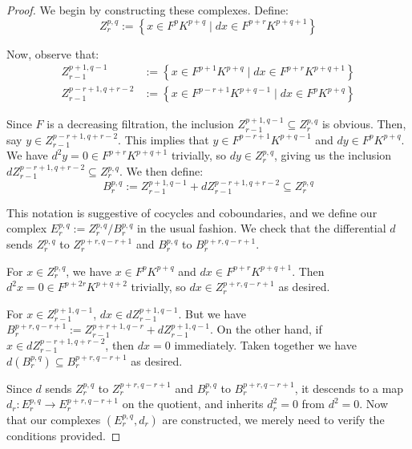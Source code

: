 \documentclass[11pt]{article}
\theoremstyle{definition}
\numberwithin{theorem}{section} %
\numberwithin{equation}{section} %
\begin{document}
\begin{proof}
    We begin by constructing these complexes. Define:
    $$
    Z^{p,q}_r:=\left\{x\in F^p K^{p+q}\mid dx\in F^{p+r}K^{p+q+1}\right\}
    $$
    
    Now, observe that:
    \begin{align*}
    Z^{p+1,q-1}_{r-1}&:= \left\{x\in F^{p+1} K^{p+q}\mid dx\in F^{p+r}K^{p+q+1}\right\} \\
    Z_{r-1}^{p-r+1,q+r-2} &:= \left\{x\in F^{p-r+1} K^{p+q-1}\mid dx\in F^{p}K^{p+q}\right\} 
    \end{align*}
    
    \noindent Since $F$ is a decreasing filtration, the inclusion $Z_{r-1}^{p+1,q-1} \subseteq Z_r^{p,q}$ is obvious. Then, say $y\in Z_{r-1}^{p-r+1,q+r-2}$. This implies that $y\in F^{p-r+1} K^{p+q-1}$ and $dy\in F^{p} K^{p+q}$. We have $d^2y =0\in F^{p+r}K^{p+q+1}$ trivially, so $dy \in Z_r^{p,q}$, giving us the inclusion $dZ_{r-1}^{p-r+1,q+r-2}\subseteq Z_r^{p,q}$. We then define:
    $$
    B_r^{p,q} := Z_{r-1}^{p+1,q-1} + dZ_{r-1}^{p-r+1,q+r-2} \subseteq Z_r^{p,q}
    $$
    
    \noindent This notation is suggestive of cocycles and coboundaries, and we define our complex $E_r^{p,q}:= Z_r^{p,q}/B_r^{p,q}$ in the usual fashion. We check that the differential $d$ sends $Z_r^{p,q}$ to $Z_r^{p+r,q-r+1}$ and $B_r^{p,q}$ to $B_r^{p+r,q-r+1}$. 

    \medskip
    
    \noindent For $x\in Z^{p,q}_r$, we have $x\in F^p K^{p+q}$ and $dx \in F^{p+r}K^{p+q+1}$. Then $d^2x = 0\in F^{p+2r}K^{p+q+2}$ trivially, so $dx\in Z_r^{p+r, q-r+1}$ as desired. 

    \medskip
    
    \noindent For $x\in Z_{r-1}^{p+1,q-1}$, $dx\in dZ_{r-1}^{p+1,q-1}$. But we have $B_r^{p+r,q-r+1}:= Z_{r-1}^{p+r+1, q-r} + dZ_{r-1}^{p+1,q-1}$. On the other hand, if $x\in dZ_{r-1}^{p-r+1,q+r-2}$, then $dx=0$ immediately. Taken together we have $d\left(B_r^{p,q}\right) \subseteq B_r^{p+r,q-r+1}$ as desired. 

    \medskip

    \noindent Since $d$ sends $Z_r^{p,q}$ to $Z_r^{p+r,q-r+1}$ and $B_r^{p,q}$ to $B_r^{p+r,q-r+1}$, it descends to a map $d_r:E_r^{p,q}\to E_r^{p+r,q-r+1}$ on the quotient, and inherits $d_r^2=0$ from $d^2=0$. Now that our complexes $\left(E_r^{p,q},d_r\right)$ are constructed, we merely need to verify the conditions provided.


\end{proof}
\end{document}
